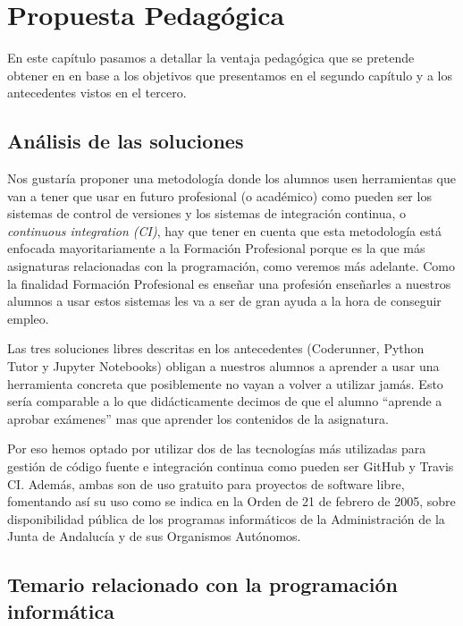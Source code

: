 \chapter{Propuesta Pedagógica}

En este capítulo pasamos a detallar la ventaja pedagógica que se pretende obtener en en base a los objetivos que presentamos en el segundo capítulo y a los antecedentes vistos en el tercero.



\section{Análisis de las soluciones}


Nos gustaría proponer una metodología donde los alumnos usen herramientas que van a tener que usar en futuro profesional (o académico) como pueden ser los sistemas de control de versiones y los sistemas de integración continua, o \textit{continuous integration (CI)}, hay que tener en cuenta que esta metodología está enfocada mayoritariamente a la Formación Profesional porque es la que más asignaturas relacionadas con la programación, como veremos más adelante. Como la finalidad Formación Profesional es enseñar una profesión enseñarles a nuestros alumnos a usar estos sistemas les va a ser de gran ayuda a la hora de conseguir empleo.

\bigskip
Las tres soluciones libres descritas en los antecedentes (Coderunner, Python Tutor y Jupyter Notebooks) obligan a nuestros alumnos a aprender a usar una herramienta concreta que posiblemente no vayan a volver a utilizar jamás. Esto sería comparable a lo que didácticamente decimos de que el alumno ``aprende a aprobar exámenes'' mas que aprender los contenidos de la asignatura.

\bigskip
Por eso hemos optado por utilizar dos de las tecnologías más utilizadas para gestión de código fuente e integración continua como pueden ser GitHub y Travis CI. Además, ambas son de uso gratuito para proyectos de software libre, fomentando así su uso como se indica en la Orden de 21 de febrero de 2005, sobre disponibilidad pública de los programas informáticos de la Administración de la Junta de Andalucía y de sus Organismos Autónomos.

\section {Temario relacionado con la programación informática}

